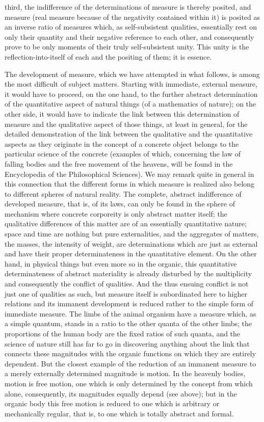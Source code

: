 third, the indifference of the determinations of
measure is thereby posited, and measure
(real measure because of the negativity contained within it)
is posited as an inverse ratio of measures
which, as self-subsistent qualities,
essentially rest on only their quantity
and their negative reference to each other,
and consequently prove to be only moments of
their truly self-subsistent unity.
This unity is the reflection-into-itself of each
and the positing of them; it is essence.

The development of measure,
which we have attempted in what follows,
is among the most difficult of subject matters.
Starting with immediate, external measure,
it would have to proceed, on the one hand,
to the further abstract determination of
the quantitative aspect of natural things
(of a mathematics of nature);
on the other side, it would have to indicate the link
between this determination of measure
and the qualitative aspect of those things,
at least in general, for the detailed demonstration of the
link between the qualitative and the quantitative aspects
as they originate in the concept of a concrete object
belongs to the particular science of the concrete
(examples of which, concerning the law of falling bodies
and the free movement of the heavens,
will be found in the Encyclopedia of the Philosophical Sciences).
We may remark quite in general in this connection
that the different forms in which measure is realized
also belong to different spheres of natural reality.
The complete, abstract indifference of developed measure,
that is, of its laws, can only be found in the sphere of mechanism
where concrete corporeity is only abstract matter itself;
the qualitative differences of this matter are
of an essentially quantitative nature;
space and time are nothing but pure externalities,
and the aggregates of matters, the masses, the intensity of weight,
are determinations which are just as external
and have their proper determinateness in the quantitative element.
On the other hand, in physical things but even more so in the organic,
this quantitative determinateness of abstract materiality is
already disturbed by the multiplicity
and consequently the conflict of qualities.
And the thus ensuing conflict is not just one of qualities as such,
but measure itself is subordinated here to higher relations
and its immanent development is reduced rather to
the simple form of immediate measure.
The limbs of the animal organism have a measure
which, as a simple quantum, stands
in a ratio to the other quanta of the other limbs;
the proportions of the human body are the fixed ratios of such quanta,
and the science of nature still has far to go in
discovering anything about the link that connects
these magnitudes with the organic functions
on which they are entirely dependent.
But the closest example of the reduction of an immanent
measure to a merely externally determined magnitude is motion.
In the heavenly bodies, motion is free motion,
one which is only determined by the concept from which alone,
consequently, its magnitudes equally depend (see above);
but in the organic body this free motion is reduced
to one which is arbitrary or mechanically regular,
that is, to one which is totally abstract and formal.


